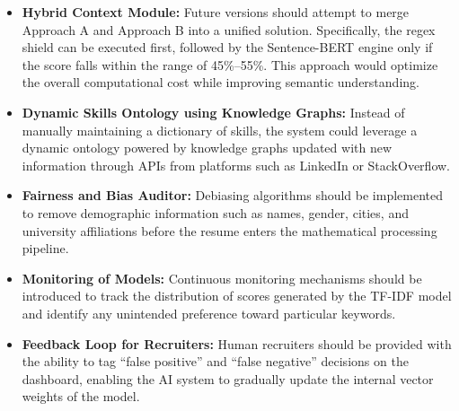 \begin{itemize}
    \item \textbf{Hybrid Context Module:} Future versions should attempt to merge Approach A and Approach B into a unified solution. Specifically, the regex shield can be executed first, followed by the Sentence-BERT engine only if the score falls within the range of 45\%--55\%. This approach would optimize the overall computational cost while improving semantic understanding.
    
    \item \textbf{Dynamic Skills Ontology using Knowledge Graphs:} Instead of manually maintaining a dictionary of skills, the system could leverage a dynamic ontology powered by knowledge graphs updated with new information through APIs from platforms such as LinkedIn or StackOverflow.
    
    \item \textbf{Fairness and Bias Auditor:} Debiasing algorithms should be implemented to remove demographic information such as names, gender, cities, and university affiliations before the resume enters the mathematical processing pipeline.
    
    \item \textbf{Monitoring of Models:} Continuous monitoring mechanisms should be introduced to track the distribution of scores generated by the TF-IDF model and identify any unintended preference toward particular keywords.
    
    \item \textbf{Feedback Loop for Recruiters:} Human recruiters should be provided with the ability to tag ``false positive'' and ``false negative'' decisions on the dashboard, enabling the AI system to gradually update the internal vector weights of the model.
\end{itemize}
